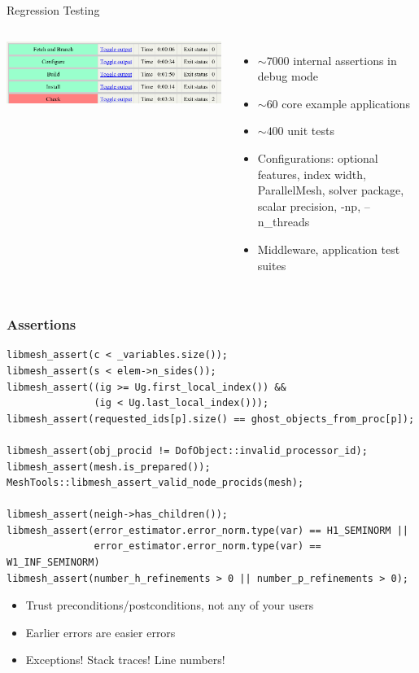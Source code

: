 \documentclass[mathserif]{beamer}
\begin{document}
\begin{frame}[t]{Regression Testing}
\begin{columns}
    \includegraphics[width=\textwidth]{civet}
    \begin{itemize}
    \item $\sim 7000$ internal assertions in debug mode
    \item $\sim 60$ core example applications 
    \item $\sim 400$ unit tests
    \item Configurations: optional features, index width, ParallelMesh,
                          solver package, scalar precision, -np, --n\_threads
    \item Middleware, application test suites
    \end{itemize}
  \end{columns}
\end{frame}


\begin{frame}[fragile]
\frametitle{Assertions}
{\footnotesize
\begin{verbatim}
libmesh_assert(c < _variables.size());
libmesh_assert(s < elem->n_sides());
libmesh_assert((ig >= Ug.first_local_index()) &&
               (ig < Ug.last_local_index()));
libmesh_assert(requested_ids[p].size() == ghost_objects_from_proc[p]);

libmesh_assert(obj_procid != DofObject::invalid_processor_id);
libmesh_assert(mesh.is_prepared());
MeshTools::libmesh_assert_valid_node_procids(mesh);

libmesh_assert(neigh->has_children());
libmesh_assert(error_estimator.error_norm.type(var) == H1_SEMINORM ||
               error_estimator.error_norm.type(var) == W1_INF_SEMINORM)
libmesh_assert(number_h_refinements > 0 || number_p_refinements > 0);
\end{verbatim}
}

\pause

\begin{itemize}[<+->]
\item Trust preconditions/postconditions, not any of your users
\item Earlier errors are easier errors
\item Exceptions!  Stack traces!  Line numbers!
\end{itemize}

\end{frame}
\end{document}

